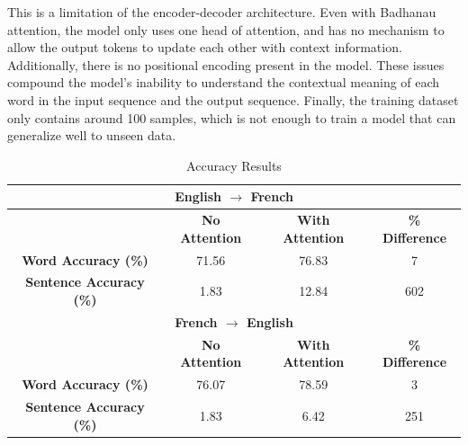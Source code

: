 \documentclass{article}
\begin{document}
This is a limitation of
the encoder-decoder architecture. Even with Badhanau
attention, the model only uses one head of attention, and
has no mechanism to allow the output tokens to update each
other with context information. Additionally, there is no
positional encoding present in the model. These issues
compound the model's inability to understand the contextual
meaning of each word in the input sequence and the output
sequence. Finally, the training dataset only contains around
100 samples, which is not enough to train a model that can
generalize well to unseen data.

\begin{table}[h]
    \begin{tabular}{|c|c|c|c|}
        \hline
        \multicolumn{4}{|c|}{\textbf{English $\rightarrow$ French}} \\
        \hline
        \hline
        & \textbf{No Attention} & \textbf{With Attention} & \textbf{\% Difference} \\        
        \hline
        \textbf{Word Accuracy (\%)} & 71.56 & 76.83 & 7 \\
        \hline
        \textbf{Sentence Accuracy (\%)} & 1.83 & 12.84 & 602 \\
        \hline
        \multicolumn{4}{|c|}{\textbf{French $\rightarrow$ English}} \\
        \hline
        \hline
        & \textbf{No Attention} & \textbf{With Attention} & \textbf{\% Difference} \\
        \hline
        \textbf{Word Accuracy (\%)} & 76.07 & 78.59 & 3 \\
        \hline
        \textbf{Sentence Accuracy (\%)} & 1.83 & 6.42 & 251 \\
        \hline
    \end{tabular}
    \caption{Accuracy Results}
    \label{tab:accuracy}
\end{table}
\end{document}
